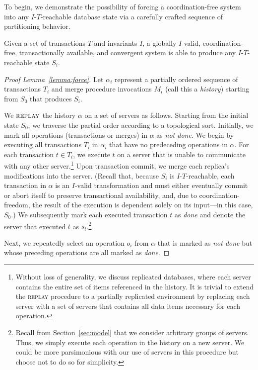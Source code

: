 To begin, we demonstrate the possibility of forcing a
coordination-free system into any $I$-$T$-reachable database state via
a carefully crafted sequence of partitioning behavior.

\begin{lemma}\label{lemma:force} 
Given a set of transactions $T$ and invariants $I$, a globally $I$-valid, coordination-free, transactionally available, and convergent system is able to produce any $I$-$T$-reachable state $S_i$.
 \end{lemma}

\begin{proof}[Proof Lemma~\ref{lemma:force}]
Let $\alpha_i$ represent a partially ordered sequence of transactions $T_i$ and merge procedure invocations $M_i$ (call this a \textit{history}) starting from $S_0$ that produces $S_i$.

We $\textsc{replay}$ the history $\alpha$ on a set of servers as
follows. Starting from the initial state $S_0$, we traverse the
partial order according to a topological sort. Initially, we mark all
operations (transactions or merges) in $\alpha$ as \textit{not
  done}. We begin by executing all transactions $T_i$ in $\alpha_i$
that have no predeceding operations in $\alpha$. For each transaction
$t \in T_i$, we execute $t$ on a server that is unable to communicate
with any other server.\footnote{Without loss of generality, we discuss
  replicated databases, where each server contains the entire set of
  items referenced in the history. It is trivial to extend the
  \textsc{replay} procedure to a partially replicated environment by
  replacing each server with a set of servers that contains all data
  items necessary for each operation.} Upon transaction commit, we
merge each replica's modifications into the server.  (Recall that,
because $S_i$ is $I$-$T$-reachable, each transaction in $\alpha$ is an
$I$-valid transformation and must either eventually commit or abort
itself to preserve transactional availability, and, due to
coordination-freedom, the result of the execution is dependent solely
on its input---in this case, $S_0$.) We subsequently mark each
executed transaction $t$ as \textit{done} and denote the server that
executed $t$ as $s_t$.\footnote{Recall from Section~\ref{sec:model}
  that we consider arbitrary groups of servers. Thus, we simply
  execute each operation in the history on a new server. We could be
  more parsimonious with our use of servers in this procedure but
  choose not to do so for simplicity.}

Next, we repeatedly select an operation $o_i$ from $\alpha$ that is
marked as \textit{not done} but whose preceding operations are all
marked as \textit{done}.


\end{proof}
